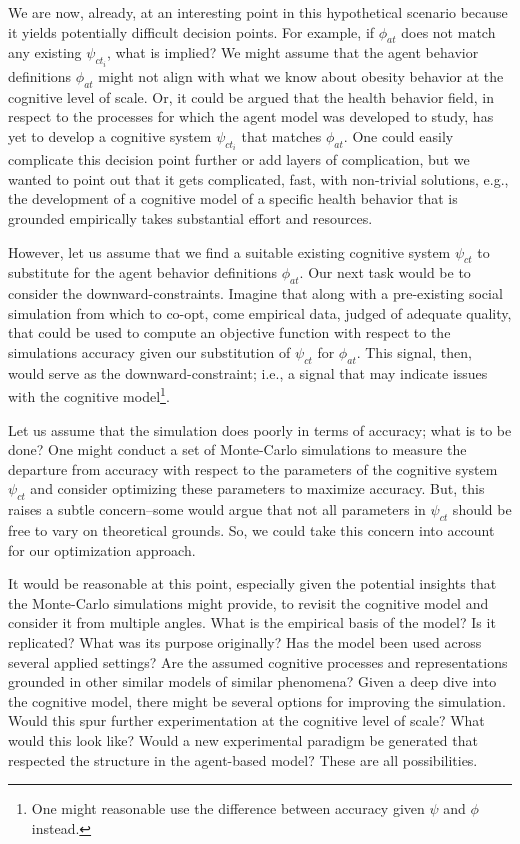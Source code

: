 \documentclass{article}
\begin{document}
We are now, already, at an interesting point in this hypothetical scenario because it yields potentially difficult decision points.  For example,  if $\phi_{at}$ does not match any existing $\psi_{ct_i}$, what is implied?  We might assume that the agent behavior definitions $\phi_{at}$ might not align with what we know about obesity behavior at the cognitive level of scale.  Or, it could be argued that the health behavior field, in respect to the processes for which the agent model was developed to study, has yet to develop a cognitive system $\psi_{ct_i}$ that matches $\phi_{at}$.  One could easily complicate this decision point further or add layers of complication, but we wanted to point out that it gets complicated, fast, with non-trivial solutions, e.g., the development of a cognitive model of a specific health behavior that is grounded empirically takes substantial effort and resources.  

However, let us assume that we find a suitable existing cognitive system $\psi_{ct}$ to substitute for the agent behavior definitions $\phi_{at}$. Our next task would be to consider the downward-constraints.  Imagine that along with a pre-existing social simulation from which to co-opt, come empirical data, judged of adequate quality, that could be used to compute an objective function with respect to the simulations accuracy given our substitution of $\psi_{ct}$ for $\phi_{at}$. This signal, then, would serve as the downward-constraint; i.e., a signal that may indicate issues with the cognitive model\footnote{One might reasonable use the difference between accuracy given $\psi$ and $\phi$ instead.}.  

Let us assume that the simulation does poorly in terms of accuracy; what is to be done?  One might conduct a set of Monte-Carlo simulations to measure the departure from accuracy with respect to the parameters of the cognitive system $\psi_{ct}$ and consider optimizing these parameters to maximize accuracy. But, this raises a subtle concern--some would argue that not all parameters in $\psi_{ct}$ should be free to vary on theoretical grounds\cite{reitter2010}.  So, we could take this concern into account for our optimization approach.  

It would be reasonable at this point, especially given the potential insights that the Monte-Carlo simulations might provide, to revisit the cognitive model and consider it from multiple angles.  What is the empirical basis of the model?  Is it replicated?  What was its purpose originally?  Has the model been used across several applied settings?  Are the assumed cognitive processes and representations grounded in other similar models of similar phenomena?  Given a deep dive into the cognitive model, there might be several options for improving the simulation.  Would this spur further experimentation at the cognitive level of scale? What would this look like?  Would a new experimental paradigm be generated that respected the structure in the agent-based model?  These are all possibilities.
\end{document}
